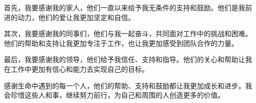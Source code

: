 
\acknowledgement

首先，我要感谢我的家人，他们一直以来给予我无条件的支持和鼓励。他们是我前进的动力，他们的爱让我更加坚定和自信。

其次，我要感谢我的同事们，他们与我一起奋斗，共同面对工作中的挑战和困难。他们的帮助和支持让我更加专注于工作，也让我更加感受到团队合作的力量。

最后，我要感谢我的领导，他们给予我信任、支持和指导。他们的关心和帮助让我在工作中更加有信心和能力去实现自己的目标。

感谢生命中遇到的每一个人，他们的帮助、支持和鼓励都让我更加成长和进步。我会珍惜这些人和事，继续努力前行，为自己和周围的人创造更多的价值。
